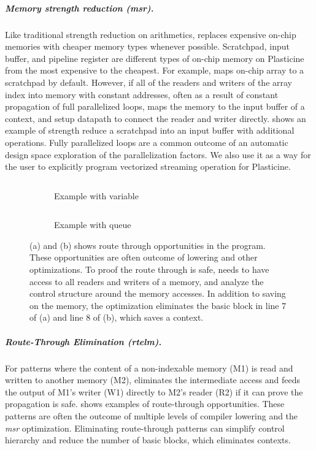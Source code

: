 \subparagraph{Memory strength reduction (msr).} Like traditional strength reduction on arithmetics,
\name{} replaces expensive on-chip memories with cheaper memory types whenever possible.
Scratchpad, input buffer, and pipeline register are different types of on-chip memory on Plasticine from
the most expensive to the cheapest.
For example, \name maps on-chip array to a scratchpad by default. However, if all of the readers and
writers of the array index into memory with constant addresses, often as a result of constant propagation of full
parallelized loops, \name maps the memory to the input buffer of a context, and setup datapath to
connect the reader and writer directly.
 shows an example of strength reduce a scratchpad into an input buffer with additional
operations.
Fully parallelized loops are a common outcome of an automatic design space exploration of the parallelization factors.
We also use it as a way for the user to explicitly program vectorized streaming operation for
Plasticine.

\begin{figure}
\centering
\begin{subfigure}[b]{0.45\textwidth}
\inputminted{python}{code/rteg1.py}
\caption{Example with variable}
\end{subfigure}
\hfill
\begin{subfigure}[b]{0.45\textwidth}
\inputminted{python}{code/rteg2.py}
\caption{Example with queue}
\end{subfigure}
\caption[Examples of route through elimination]{
  (a) and (b) shows route through opportunities in the program.
  These opportunities are often outcome of lowering and other optimizations. To proof the route
  through is safe, \name needs to have access to all readers and writers of a memory, and analyze
  the control structure around the memory accesses.
  In addition to saving on the memory, the optimization eliminates the basic block in line 7 of (a)
  and line 8 of (b), which saves a context.
}
\label{fig:rtelm}
\end{figure}

\subparagraph{Route-Through Elimination (rtelm).} 
For patterns where the content of a non-indexable memory (M1) is read and written to another memory
(M2), \name{} eliminates the intermediate access and feeds the output of M1's writer (W1) directly to M2's
reader (R2) if it can prove the propagation is safe.
 shows examples of route-through opportunities.
These patterns are often the
outcome of multiple levels of compiler lowering and the \emph{msr} optimization. 
Eliminating route-through patterns can simplify control hierarchy and reduce the number of basic blocks, which eliminates contexts.


